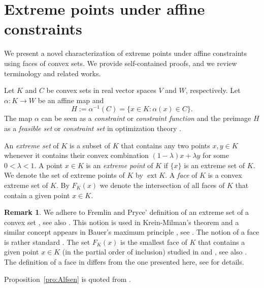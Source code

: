 \documentclass[a4paper,11pt,reqno]{amsart}
\numberwithin{equation}{section}
\theoremstyle{plain}
\theoremstyle{definition}
\newtheorem{remark}[theorem]{Remark}
\DeclareMathOperator{\ext}{ext} %
\begin{document}
\section{Extreme points under affine constraints}
\label{sec:main-result}
%
We present a novel characterization of extreme points under affine constraints 
using faces of convex sets. We provide self-contained proofs, and we review  
terminology and related works.
\par
%
Let $K$ and $C$ be convex sets in real vector spaces $V$ and $W$\!, respectively.
Let $\alpha\colon K\to W$ be an affine map and  
\begin{equation}\label{eq:constraint-set}
H:=\alpha^{-1}(C)
=\{x\in K : \alpha(x)\in C\}.
\end{equation}
The map $\alpha$ can be seen as a \emph{constraint} or \emph{constraint function} 
and the preimage $H$ as a \emph{feasible set} or \emph{constraint set} in 
optimization theory \cite{ben-tal-nemirovski01,jahn07}.
\par
%
An \emph{extreme set} of $K$ is a subset of $K$ that contains 
any two points $x,y\in K$ whenever it contains their convex combination 
$(1-\lambda)x + \lambda y$ for some $0<\lambda< 1$. A point 
$x\in K$ is an \emph{extreme point} of $K$ if $\{x\}$ is an extreme 
set of $K$. We denote the set of extreme points of $K$ by $\ext K$. 
A \emph{face} of $K$ is a convex extreme set of $K$. By $F_K(x)$ we denote the 
intersection of all faces of $K$ that contain a given point $x\in K$. 
\par
%
\begin{remark}\label{rem:extreme}
We adhere to Fremlin and Pryce' definition of an extreme set of a 
convex set \cite{fremlin-pryce74}, see also \cite{holmes75}. This
notion is used in Krein-Milman's theorem \cite{rudin91} and a similar 
concept appears in Bauer's maximum principle \cite{bauer58}, see 
\cite[pp.~110--113]{phelps01}. The notion of a face is rather standard
\cite{alfsen71,alfsen-shultz01,fremlin-pryce74,phelps01,rockafellar70,schneider14}.
The set $F_K(x)$ is the smallest face of $K$ that contains a given point $x\in K$ 
(in the partial order of inclusion) studied in \cite{dubins62} and 
\cite[Section~II.5]{alfsen71}, see also 
\cite{garcia-pacheco20,gorokhovik25,millan-roshchina23,weis25,weis-shirokov21}.
The definition of a face in \cite{dubins62} differs from the one presented here, 
see \cite[Section~8]{weis25} for details.
\end{remark}
%
Proposition~\ref{pro:Alfsen} is quoted from \cite[p.~121]{alfsen71}. 
\end{document}
